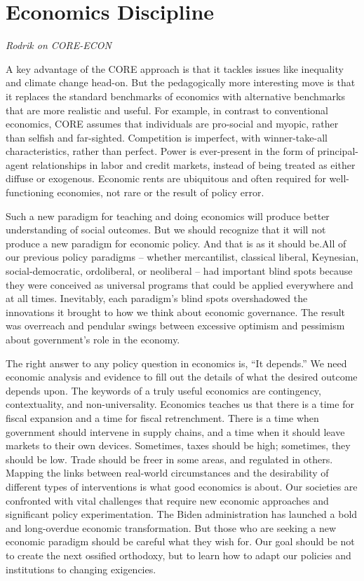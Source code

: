 \documentclass[
]{book}
\begin{document}
\hypertarget{economics-discipline}{%
\section{Economics Discipline}\label{economics-discipline}}

\emph{Rodrik on CORE-ECON}

A key advantage of the CORE approach is that it tackles issues like inequality and climate change head-on. But the pedagogically more interesting move is that it replaces the standard benchmarks of economics with alternative benchmarks that are more realistic and useful. For example, in contrast to conventional economics, CORE assumes that individuals are pro-social and myopic, rather than selfish and far-sighted. Competition is imperfect, with winner-take-all characteristics, rather than perfect. Power is ever-present in the form of principal-agent relationships in labor and credit markets, instead of being treated as either diffuse or exogenous. Economic rents are ubiquitous and often required for well-functioning economies, not rare or the result of policy error.

Such a new paradigm for teaching and doing economics will produce better understanding of social outcomes. But we should recognize that it will not produce a new paradigm for economic policy. And that is as it should be.All of our previous policy paradigms -- whether mercantilist, classical liberal, Keynesian, social-democratic, ordoliberal, or neoliberal -- had important blind spots because they were conceived as universal programs that could be applied everywhere and at all times. Inevitably, each paradigm's blind spots overshadowed the innovations it brought to how we think about economic governance. The result was overreach and pendular swings between excessive optimism and pessimism about government's role in the economy.

The right answer to any policy question in economics is, ``It depends.'' We need economic analysis and evidence to fill out the details of what the desired outcome depends upon. The keywords of a truly useful economics are contingency, contextuality, and non-universality. Economics teaches us that there is a time for fiscal expansion and a time for fiscal retrenchment. There is a time when government should intervene in supply chains, and a time when it should leave markets to their own devices. Sometimes, taxes should be high; sometimes, they should be low. Trade should be freer in some areas, and regulated in others. Mapping the links between real-world circumstances and the desirability of different types of interventions is what good economics is about. Our societies are confronted with vital challenges that require new economic approaches and significant policy experimentation. The Biden administration has launched a bold and long-overdue economic transformation. But those who are seeking a new economic paradigm should be careful what they wish for. Our goal should be not to create the next ossified orthodoxy, but to learn how to adapt our policies and institutions to changing exigencies.
\end{document}
